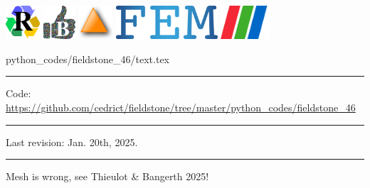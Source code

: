\includegraphics[height=1.25cm]{images/pictograms/replication}
\includegraphics[height=1.25cm]{images/pictograms/benchmark}
\includegraphics[height=1.25cm]{images/pictograms/triangle}
\includegraphics[height=1.25cm]{images/pictograms/FEM}
\includegraphics[height=1.25cm]{images/pictograms/paraview}


\begin{flushright} {\tiny {\color{gray} python\_codes/fieldstone\_46/text.tex}} \end{flushright}

%

\par\noindent\rule{\textwidth}{0.4pt}

\begin{center}
\inpython
{\small Code: \url{https://github.com/cedrict/fieldstone/tree/master/python_codes/fieldstone_46}}
\end{center}

\par\noindent\rule{\textwidth}{0.4pt}

Last revision: Jan. 20th, 2025.

\par\noindent\rule{\textwidth}{0.4pt}


{\color{red} Mesh is wrong, see Thieulot \& Bangerth 2025!}

